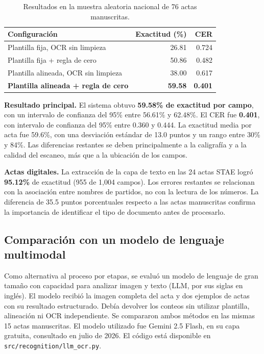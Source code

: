 \documentclass[conference]{IEEEtran}
\begin{document}
\begin{table}[t]
\caption{Resultados en la muestra aleatoria nacional de 76 actas manuscritas.}
\label{tab:national}
\centering
\begin{tabular}{lrr}
\toprule
Configuraci\'on & Exactitud (\%) & CER \\
\midrule
Plantilla fija, OCR sin limpieza & 26.81 & 0.724 \\
Plantilla fija + regla de cero & 50.86 & 0.482 \\
Plantilla alineada, OCR sin limpieza & 38.00 & 0.617 \\
\textbf{Plantilla alineada + regla de cero} & \textbf{59.58} & \textbf{0.401} \\
\bottomrule
\end{tabular}
\end{table}

\textbf{Resultado principal.} El sistema obtuvo \textbf{59.58\% de exactitud
por campo}, con un intervalo de confianza del 95\% entre 56.61\% y 62.48\%.
El CER fue \textbf{0.401}, con intervalo de confianza del 95\% entre 0.360 y
0.444. La exactitud media por acta fue 59.6\%, con una desviaci\'on est\'andar
de 13.0 puntos y un rango entre 30\% y 84\%. Las diferencias restantes se
deben principalmente a la caligraf\'ia y a la calidad del escaneo, m\'as que a
la ubicaci\'on de los campos.

\textbf{Actas digitales.} La extracci\'on de la capa de texto en las 24 actas
STAE logr\'o \textbf{95.12\%} de exactitud (955 de 1,004 campos). Los errores
restantes se relacionan con la asociaci\'on entre nombres de partidos, no con
la lectura de los n\'umeros. La diferencia de 35.5 puntos porcentuales respecto
a las actas manuscritas confirma la importancia de identificar el tipo de
documento antes de procesarlo.

\subsection{Comparaci\'on con un modelo de lenguaje multimodal}
\label{sec:llm}
Como alternativa al proceso por etapas, se evalu\'o un modelo de lenguaje de
gran tama\~no con capacidad para analizar imagen y texto (LLM, por sus siglas en
ingl\'es). El modelo recibi\'o la imagen
completa del acta y dos ejemplos de actas con su resultado estructurado. Deb\'ia
devolver los conteos sin utilizar plantilla, alineaci\'on ni OCR
independiente. Se compararon ambos m\'etodos en las mismas 15 actas manuscritas. El modelo utilizado fue Gemini 2.5 Flash, en su capa gratuita,
consultado en julio de 2026. El c\'odigo est\'a disponible en
\texttt{src/recognition/llm\_ocr.py}.
\end{document}
